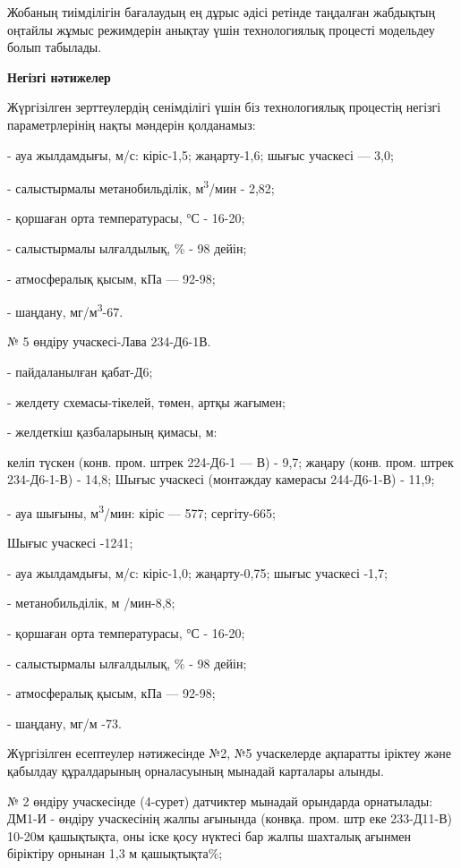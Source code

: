 \begin{multicols}{2}
Жобаның тиімділігін бағалаудың ең дұрыс әдісі ретінде таңдалған
жабдықтың оңтайлы жұмыс режимдерін анықтау үшін технологиялық процесті
модельдеу болып табылады.

{\bfseries Негізгі нәтижелер}

Жүргізілген зерттеулердің сенімділігі үшін біз технологиялық процестің
негізгі параметрлерінің нақты мәндерін қолданамыз:

- ауа жылдамдығы, м/с: кіріс-1,5; жаңарту-1,6; шығыс учаскесі --- 3,0;

- салыстырмалы метанобильділік, м\textsuperscript{3}/мин - 2,82;

- қоршаған орта температурасы, °С - 16-20;

- салыстырмалы ылғалдылық, \% - 98 дейін;

- атмосфералық қысым, кПа --- 92-98;

- шаңдану, мг/м\textsuperscript{3}-67.

№ 5 өндіру учаскесі-Лава 234-Д6-1В.

- пайдаланылған қабат-Д6;

- желдету схемасы-тікелей, төмен, артқы жағымен;

- желдеткіш қазбаларының қимасы, м:

келіп түскен (конв. пром. штрек 224-Д6-1 --- В) - 9,7; жаңару (конв.
пром. штрек 234-Д6-1-В) - 14,8; Шығыс учаскесі (монтаждау камерасы
244-Д6-1-В) - 11,9;

- ауа шығыны, м\textsuperscript{3}/мин: кіріс --- 577; сергіту-665;

Шығыс учаскесі -1241;

- ауа жылдамдығы, м/с: кіріс-1,0; жаңарту-0,75; шығыс учаскесі -1,7;

- метанобильділік, м /мин-8,8;

- қоршаған орта температурасы, °С - 16-20;

- салыстырмалы ылғалдылық, \% - 98 дейін;

- атмосфералық қысым, кПа --- 92-98;

- шаңдану, мг/м -73.

Жүргізілген есептеулер нәтижесінде №2, №5 учаскелерде ақпаратты іріктеу
және қабылдау құралдарының орналасуының мынадай карталары алынды.

№ 2 өндіру учаскесінде (4-сурет) датчиктер мынадай орындарда орнатылады:
ДМ1-И - өндіру учаскесінің жалпы ағынында (конвқа. пром. штр еке
233-Д11-В) 10-20м қашықтықта, оны іске қосу нүктесі бар жалпы шахталық
ағынмен біріктіру орнынан 1,3 м қашықтықта\%;


\end{multicols}
